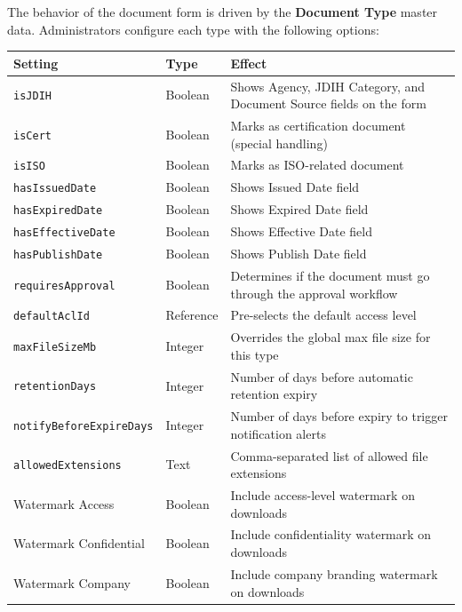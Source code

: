 The behavior of the document form is driven by the
\textbf{Document Type} master data. Administrators configure
each type with the following options:

\begin{tabularx}{\textwidth}{@{} l l X @{}}
  \toprule
  \textbf{Setting} & \textbf{Type}
    & \textbf{Effect} \\
  \midrule
  \texttt{isJDIH}
    & Boolean
    & Shows Agency, JDIH Category, and Document
      Source fields on the form \\
  \texttt{isCert}
    & Boolean
    & Marks as certification document (special
      handling) \\
  \texttt{isISO}
    & Boolean
    & Marks as ISO-related document \\
  \texttt{hasIssuedDate}
    & Boolean
    & Shows Issued Date field \\
  \texttt{hasExpiredDate}
    & Boolean
    & Shows Expired Date field \\
  \texttt{hasEffectiveDate}
    & Boolean
    & Shows Effective Date field \\
  \texttt{hasPublishDate}
    & Boolean
    & Shows Publish Date field \\
  \texttt{requiresApproval}
    & Boolean
    & Determines if the document must go through the
      approval workflow \\
  \texttt{defaultAclId}
    & Reference
    & Pre-selects the default access level \\
  \texttt{maxFileSizeMb}
    & Integer
    & Overrides the global max file size for this
      type \\
  \texttt{retentionDays}
    & Integer
    & Number of days before automatic retention
      expiry \\
  \texttt{notifyBeforeExpireDays}
    & Integer
    & Number of days before expiry to trigger
      notification alerts \\
  \texttt{allowedExtensions}
    & Text
    & Comma-separated list of allowed file
      extensions \\
  Watermark Access
    & Boolean
    & Include access-level watermark on downloads \\
  Watermark Confidential
    & Boolean
    & Include confidentiality watermark on downloads \\
  Watermark Company
    & Boolean
    & Include company branding watermark on
      downloads \\
  \bottomrule
\end{tabularx}

